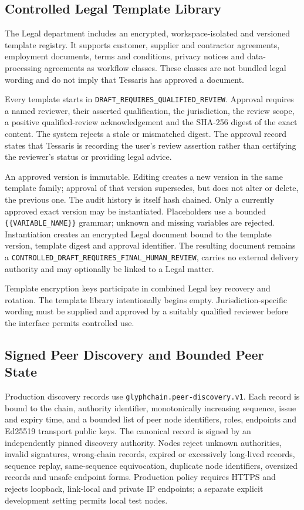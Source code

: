 \subsection{Controlled Legal Template Library}

The Legal department includes an encrypted, workspace-isolated and versioned
template registry. It supports customer, supplier and contractor agreements,
employment documents, terms and conditions, privacy notices and data-processing
agreements as workflow classes. These classes are not bundled legal wording and
do not imply that Tessaris has approved a document.

Every template starts in
\texttt{DRAFT\_REQUIRES\_QUALIFIED\_REVIEW}. Approval requires a named reviewer,
their asserted qualification, the jurisdiction, the review scope, a positive
qualified-review acknowledgement and the SHA-256 digest of the exact content.
The system rejects a stale or mismatched digest. The approval record states that
Tessaris is recording the user's review assertion rather than certifying the
reviewer's status or providing legal advice.

An approved version is immutable. Editing creates a new version in the same
template family; approval of that version supersedes, but does not alter or
delete, the previous one. The audit history is itself hash chained. Only a
currently approved exact version may be instantiated. Placeholders use a
bounded \texttt{\{\{VARIABLE\_NAME\}\}} grammar; unknown and missing variables
are rejected. Instantiation creates an encrypted Legal document bound to the
template version, template digest and approval identifier. The resulting
document remains a
\texttt{CONTROLLED\_DRAFT\_REQUIRES\_FINAL\_HUMAN\_REVIEW}, carries no external
delivery authority and may optionally be linked to a Legal matter.

Template encryption keys participate in combined Legal key recovery and
rotation. The template library intentionally begins empty. Jurisdiction-specific
wording must be supplied and approved by a suitably qualified reviewer before
the interface permits controlled use.

\subsection{Signed Peer Discovery and Bounded Peer State}

Production discovery records use
\texttt{glyphchain.peer-discovery.v1}. Each record is bound to the chain,
authority identifier, monotonically increasing sequence, issue and expiry time,
and a bounded list of peer node identifiers, roles, endpoints and Ed25519
transport public keys. The canonical record is signed by an independently
pinned discovery authority. Nodes reject unknown authorities, invalid
signatures, wrong-chain records, expired or excessively long-lived records,
sequence replay, same-sequence equivocation, duplicate node identifiers,
oversized records and unsafe endpoint forms. Production policy requires HTTPS
and rejects loopback, link-local and private IP endpoints; a separate explicit
development setting permits local test nodes.

